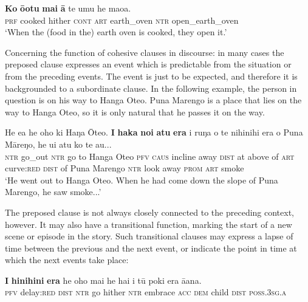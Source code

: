 \ea\label{ex:11.218}
\gll \textbf{Ko} \textbf{{\ꞌ}ō{\ꞌ}otu}{\rmfnm} \textbf{mai} \textbf{{\ꞌ}ā} te {\ꞌ}umu he ma{\ꞌ}oa.\\
\textsc{prf} cooked hither \textsc{cont} \textsc{art} earth\_oven \textsc{ntr} open\_earth\_oven\\

\glt 
‘When the (food in the) earth oven is cooked, they open it.’ \textstyleExampleref{[R372.075]} 
\z
{}

Concerning the function of cohesive clauses in discourse: in many cases the preposed clause expresses an event which is predictable from the situation or from the preceding events. The event is just to be expected, and therefore it is backgrounded to a subordinate clause. In the following example, the person in question is on his way to Hanga Oteo. Puna Marengo is a place that lies on the way to Hanga Oteo, so it is only natural that he passes it on the way.

\ea\label{ex:11.219}
\gll He e{\ꞌ}a he oho ki Haŋa {\ꞌ}Ōteo. \textbf{I} \textbf{haka} \textbf{noi} \textbf{atu} \textbf{era} {\ꞌ}i ruŋa o te nihinihi era o Puna Māreŋo, he u{\ꞌ}i atu ko te {\ꞌ}au... \\
\textsc{ntr} go\_out \textsc{ntr} go to Hanga Oteo \textsc{pfv} \textsc{caus} incline away \textsc{dist} at above of \textsc{art} curve:\textsc{red} \textsc{dist} of Puna Marengo \textsc{ntr} look away \textsc{prom} \textsc{art} smoke \\

\glt
‘He went out to Hanga Oteo. When he had come down the slope of Puna Marengo, he saw smoke...’ \textstyleExampleref{[R313.091]} 
\z

The preposed clause is not always closely connected to the preceding context, however. It may also have a transitional function, marking the start of a new scene or episode in the story. Such transitional clauses may express a lapse of time between the previous and the next event, or indicate the point in time at which the next events take place:

\ea\label{ex:11.220}
\gll \textbf{I} \textbf{hinihini} \textbf{era} he oho mai he ha{\ꞌ}i i tū poki era {\ꞌ}ā{\ꞌ}ana. \\
\textsc{pfv} delay:\textsc{red} \textsc{dist} \textsc{ntr} go hither \textsc{ntr} embrace \textsc{acc} \textsc{dem} child \textsc{dist} \textsc{poss.3sg.a} \\

